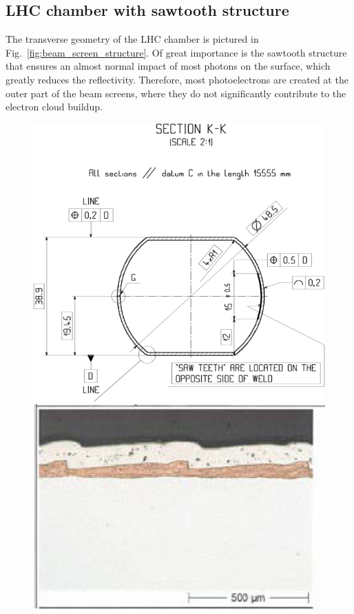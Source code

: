 
\subsection{LHC chamber with sawtooth structure}
The transverse geometry of the LHC chamber is pictured in Fig.~\ref{fig:beam_screen_structure}.
Of great importance is the sawtooth structure that ensures an almost normal impact of most photons on the surface, which greatly reduces the reflectivity.
Therefore, most photoelectrons are created at the outer part of the beam screens, where they do not significantly contribute to the electron cloud buildup.

\begin{figure}[tbh]
    \centering
    \begin{minipage}[c]{0.47\textwidth}
        \includegraphics[width=\textwidth]{../ss/beam_screen_drawing.png}
    \end{minipage}
    \hspace{0.5cm}
    \begin{minipage}[c]{0.47\textwidth}
        \includegraphics[width=\textwidth]{../ss/sawtooth_fine.png}

\end{minipage}
\end{figure}
